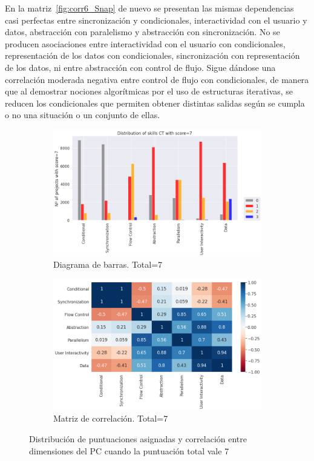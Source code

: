 \documentclass[a4paper, 12pt]{book}
\begin{document}
En la matriz~\ref{fig:corr6_Snap} de nuevo se presentan las mismas dependencias casi perfectas entre sincronización y condicionales, interactividad con el usuario y datos, abstracción con paralelismo y abstracción con sincronización. No se producen asociaciones entre interactividad con el usuario con condicionales, representación de los datos con condicionales, sincronización con representación de los datos, ni entre abstracción con control de flujo. Sigue dándose una correlación moderada negativa entre control de flujo con condicionales, de manera que al demostrar nociones algorítmicas por el uso de estructuras iterativas, se reducen los condicionales que permiten obtener distintas salidas según se cumpla o no una situación o un conjunto de ellas.

\begin{figure}[H]
    \centering
    \begin{subfigure}[h]{.49\textwidth} 
        \includegraphics[width=\textwidth]{img/distribucion_7_Snap}
        \caption{Diagrama de barras. Total=7}
        \label{fig:total7_Snap}
    \end{subfigure}       
    \begin{subfigure}[h]{.49\textwidth} 
        \includegraphics[width=\textwidth]{img/corr_7_Snap}
        \caption{Matriz de correlación. Total=7}
        \label{fig:corr7_Snap}
    \end{subfigure}
    \caption{Distribución de puntuaciones asignadas y correlación entre dimensiones del PC cuando la puntuación total vale 7}
\end{figure}
\end{document}
